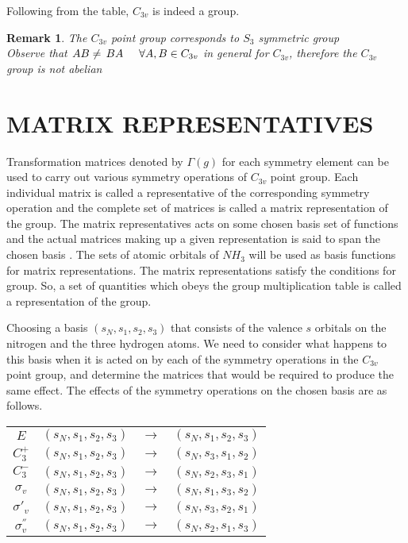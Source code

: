 \documentclass[a4paper, 12pt, openany]{report}
\newtheorem{rmk}{Remark}[section]
\begin{document}
Following from the table, $C_{3v}$ is indeed a group.
\begin{rmk} The $C_{3v}$  point group corresponds to $S_3$ symmetric group \\
	Observe that $AB\neq\,BA\hspace{0.5cm} \forall A,B\in C_{3v}$ in general for $C_{3v}$, therefore the $C_{3v}$ group is not abelian
\end{rmk}

\section{MATRIX REPRESENTATIVES}
Transformation matrices denoted by $\Gamma(g)$ for each symmetry element can be used to carry out various symmetry operations of $C_{3v}$  point group. Each individual matrix is called a representative of the corresponding symmetry operation and the complete set of matrices is called a matrix representation of the group. The matrix representatives acts on some chosen basis set of functions  and the actual matrices making up a given representation is said to span the chosen basis . The sets of atomic orbitals of $NH_3$ will be used as basis functions for matrix representations. The matrix representations satisfy the conditions for group. So, a set of quantities which obeys the group multiplication table is called a representation of the group.

Choosing a basis $(s_N,s_1,s_2,s_3)$ that consists of the valence $s$ orbitals on the nitrogen and the three hydrogen atoms. We need to consider what happens to this basis when it is acted on by each of the symmetry operations in
the $C_{3v}$ point group, and determine the matrices that would be required to produce the same effect. The effects of the symmetry operations on the chosen basis are as follows.

 \begin{table}[H]\centering
	\begin{tabular}{cc c c}
$E$&$(s_N,s_1,s_2,s_3)$&$\longrightarrow$&$(s_N,s_1,s_2,s_3)$\\
$C_3^+$&$(s_N,s_1,s_2,s_3)$&$\longrightarrow$&$(s_N,s_3,s_1,s_2)$\\
$C_3^-$&$(s_N,s_1,s_2,s_3)$&$\longrightarrow$&$(s_N,s_2,s_3,s_1)$\\
$\sigma_v$&$(s_N,s_1,s_2,s_3)$&$\longrightarrow$&$(s_N,s_1,s_3,s_2)$\\
$\sigma'_v$&$(s_N,s_1,s_2,s_3)$&$\longrightarrow$&$(s_N,s_3,s_2,s_1)$\\
$\sigma_v^{''}$&$(s_N,s_1,s_2,s_3)$&$\longrightarrow$&$(s_N,s_2,s_1,s_3)$
\end{tabular}\end{table}
\end{document}
